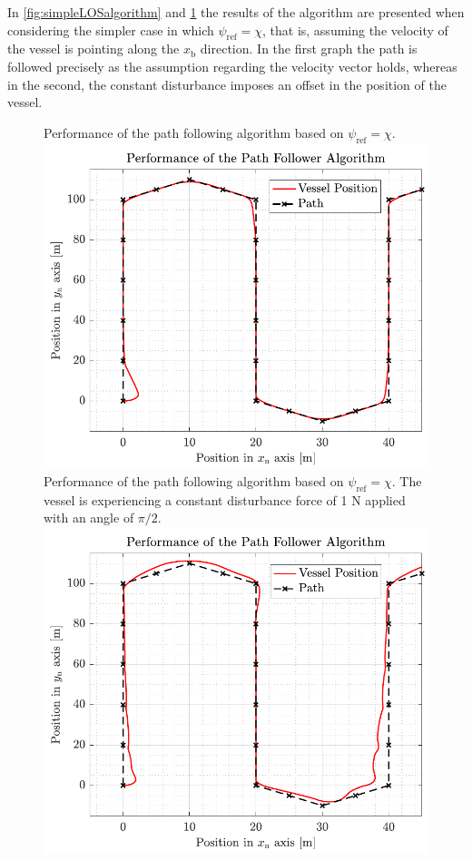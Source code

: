 In \autoref{fig:simpleLOSalgorithm} and \ref{fig:simpleLOSalgorithmdisturbance} the results of the algorithm are presented when considering the simpler case in which $\psi_\mathrm{ref} = \chi$, that is, assuming the velocity of the vessel is pointing along the $x_\mathrm{b}$ direction. In the first graph the path is followed precisely as the assumption regarding the velocity vector holds,  whereas in the second, the constant disturbance imposes an offset in the position of the vessel.
\begin{figure}[H]
	\captionbox  %
	{               %
	 	Performance of the path following algorithm based on $\psi_\mathrm{ref}=\chi$.                %
		\label{fig:simpleLOSalgorithm}                                  %
	}                                                                 %
	{                                                                  %
		\includegraphics[width=.45\textwidth]{figures/pathfollowingsimple}         %
	}                                                                    %
	\hspace{5pt}                                                          %
	\captionbox  %
	{       
		Performance of the path following algorithm based on $\psi_\mathrm{ref}=\chi$. The vessel is experiencing a constant disturbance force of 1 N applied with an angle of $\pi/2$.                                                                  %
		\label{fig:simpleLOSalgorithmdisturbance}                                     %
	}                                                                           %
	{                                                                            %
		\includegraphics[width=.45\textwidth]{figures/pathfollowingsimpledist}            %
	}                                                                             %
\end{figure}
